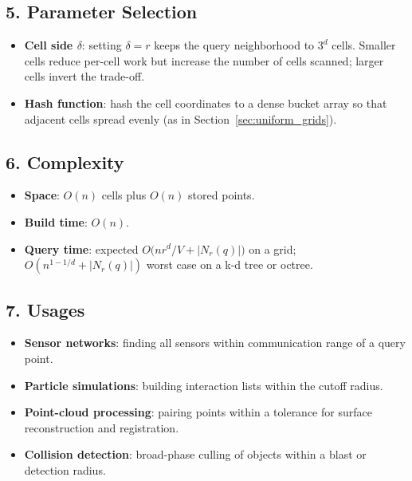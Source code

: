 \subsection{5. Parameter Selection}
\begin{itemize}
    \item \textbf{Cell side $\delta$}: setting $\delta = r$ keeps the query
      neighborhood to $3^d$ cells. Smaller cells reduce per-cell work but
      increase the number of cells scanned; larger cells invert the trade-off.
    \item \textbf{Hash function}: hash the cell coordinates to a dense bucket
      array so that adjacent cells spread evenly (as in
      Section~\ref{sec:uniform_grids}).
\end{itemize}

\subsection{6. Complexity}
\begin{itemize}
    \item \textbf{Space}: $O(n)$ cells plus $O(n)$ stored points.
    \item \textbf{Build time}: $O(n)$.
    \item \textbf{Query time}: expected $O\bigl(n r^d / V + |N_r(q)|\bigr)$ on
      a grid; $O(n^{1-1/d} + |N_r(q)|)$ worst case on a k-d tree or octree.
\end{itemize}

\subsection{7. Usages}
\begin{itemize}
    \item \textbf{Sensor networks}: finding all sensors within communication
      range of a query point.
    \item \textbf{Particle simulations}: building interaction lists within the
      cutoff radius.
    \item \textbf{Point-cloud processing}: pairing points within a tolerance
      for surface reconstruction and registration.
    \item \textbf{Collision detection}: broad-phase culling of objects within
      a blast or detection radius.
\end{itemize}


